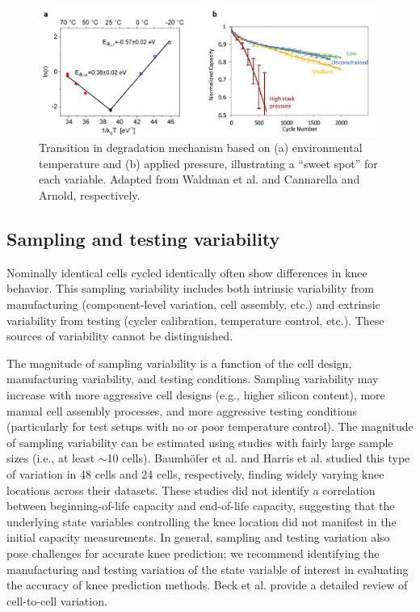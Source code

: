 \documentclass[journal=jpcl, manuscript=article, layout=onecolumn]{achemso}
\begin{document}
\begin{figure}[ht]
\centering
\includegraphics[scale = 1.0]{images/Temperature_and_pressure.png}
\caption{Transition in degradation mechanism based on (a) environmental temperature and (b) applied pressure, illustrating a ``sweet spot'' for each variable. Adapted from Waldman et al.\cite{waldmann_temperature_2014} and Cannarella and Arnold\cite{cannarella_stress_2014}, respectively.}
\label{fig:temperature_and_pressure}
\end{figure}



\subsection{Sampling and testing variability}

Nominally identical cells cycled identically often show differences in knee behavior. This sampling variability includes both intrinsic variability from manufacturing (component-level variation, cell assembly, etc.) and extrinsic variability from testing (cycler calibration, temperature control, etc.). These sources of variability cannot be distinguished.

The magnitude of sampling variability is a function of the cell design, manufacturing variability, and testing conditions. Sampling variability may increase with more aggressive cell designs (e.g., higher silicon content), more manual cell assembly processes, and more aggressive testing conditions (particularly for test setups with no or poor temperature control). The magnitude of sampling variability can be estimated using studies with fairly large sample sizes (i.e., at least $\sim$10 cells). Baumhöfer et al.\cite{baumhofer_production_2014} and Harris et al.\cite{harris_failure_2017} studied this type of variation in 48 cells and 24 cells, respectively, finding widely varying knee locations across their datasets. These studies did not identify a correlation between beginning-of-life capacity and end-of-life capacity, suggesting that the underlying state variables controlling the knee location did not manifest in the initial capacity measurements. In general, sampling and testing variation also pose challenges for accurate knee prediction; we recommend identifying the manufacturing and testing variation of the state variable of interest in evaluating the accuracy of knee prediction methods. Beck et al.\cite{beck_inhomogeneities_2021} provide a detailed review of cell-to-cell variation.
\end{document}
